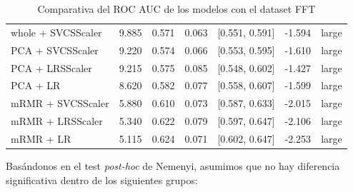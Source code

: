 \documentclass[a4paper,oneside,11pt,leqno]{article}
\begin{document}
\begin{table}[h]
\begin{tabular}{lrrrlll}
			whole + SVCSScaler &  9.885 & 0.571 & 0.063 &  [0.551, 0.591] & -1.594 &       large \\
			PCA + SVCSScaler   &  9.220 & 0.574 & 0.066 &  [0.553, 0.595] & -1.610 &       large \\
			PCA + LRSScaler    &  9.215 & 0.575 & 0.085 &  [0.548, 0.602] & -1.427 &       large \\
			PCA + LR           &  8.620 & 0.582 & 0.077 &  [0.558, 0.607] & -1.599 &       large \\
			mRMR + SVCSScaler  &  5.880 & 0.610 & 0.073 &  [0.587, 0.633] & -2.015 &       large \\
			mRMR + LRSScaler   &  5.340 & 0.622 & 0.079 &  [0.597, 0.647] & -2.106 &       large \\
			mRMR + LR          &  5.115 & 0.624 & 0.071 &  [0.602, 0.647] & -2.253 &       large \\
			\bottomrule
		\end{tabular}
		\caption{Comparativa del ROC AUC de los modelos con el dataset FFT}
		\label{tab:stat_results_fft}
	\end{table}

	Basándonos en el test \textit{post-hoc} de Nemenyi, asumimos que no hay diferencia significativa dentro de los siguientes grupos:
\end{document}

